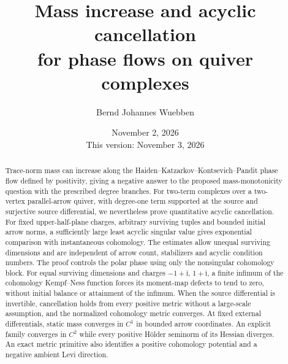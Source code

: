 \documentclass[11pt]{amsart}
\title[Phase flows on quiver complexes]{Mass increase and acyclic cancellation\\
for phase flows on quiver complexes}
\author{Bernd Johannes Wuebben}
\date{November 2, 2026\\This version: November 3, 2026}
\theoremstyle{definition}
\theoremstyle{remark}
\newcommand{\ii}{\mathrm i}
\begin{document}
\begin{abstract}
Trace-norm mass can increase along the Haiden--Katzarkov--Kontsevich--Pandit
phase flow defined by positivity, giving a negative answer to the proposed
mass-monotonicity question with the prescribed degree branches.
For two-term complexes over a two-vertex parallel-arrow quiver, with
degree-one term supported at the source and surjective source differential,
we nevertheless prove quantitative acyclic cancellation. For fixed upper-half-plane charges, arbitrary surviving
tuples and bounded initial arrow norms, a sufficiently large least acyclic
singular value gives exponential comparison with instantaneous cohomology.
The estimates allow unequal surviving dimensions and are independent of
arrow count, stabilizers and acyclic condition numbers. The proof controls
the polar phase using only the nonsingular cohomology block.
For equal surviving dimensions and charges $-1+\ii$, $1+\ii$, a finite
infimum of the cohomology Kempf--Ness function forces its moment-map defects
to tend to zero,
without initial balance or attainment of the infimum. When the source
differential is invertible, cancellation holds from every positive metric
without a large-scale assumption, and the normalized cohomology metric converges.
At fixed external differentials, static mass converges in $C^1$ in bounded
arrow coordinates. An explicit family converges in $C^2$ while every positive
H\"older seminorm of its Hessian diverges. An exact metric primitive also
identifies a positive cohomology potential and a negative ambient Levi direction.
\end{abstract}
\maketitle











\end{document}
